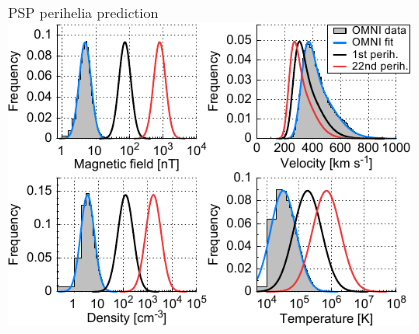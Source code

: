\begin{frame}[plain,c]{PSP perihelia prediction}{}
	\centering
	\includegraphics[width=0.8\textwidth]{../figures_paper/SPP_sw_distributions_b.pdf}
\end{frame}



% 





